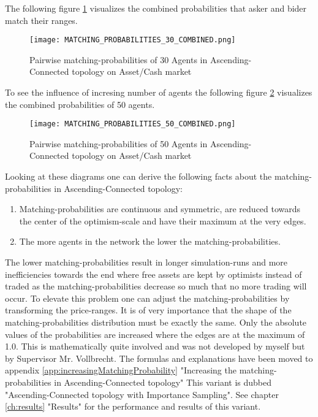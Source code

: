 \documentclass[Bachelorarbeit.tex]{subfiles}
\begin{document}
The following figure \ref{fig:MATCHING_PROBABILITIES_30_COMBINED} visualizes the combined probabilities that asker and bider match their ranges.

\begin{figure}[H]
	\centering
  \texttt{[image: MATCHING\_PROBABILITIES\_30\_COMBINED.png]}
	\caption{Pairwise matching-probabilities of 30 Agents in Ascending-Connected topology on Asset/Cash market}
	\label{fig:MATCHING_PROBABILITIES_30_COMBINED}
\end{figure}

To see the influence of incresing number of agents the following figure \ref{fig:MATCHING_PROBABILITIES_50_COMBINED} visualizes the combined probabilities of 50 agents.

\begin{figure}[H]
	\centering
  \texttt{[image: MATCHING\_PROBABILITIES\_50\_COMBINED.png]}
	\caption{Pairwise matching-probabilities of 50 Agents in Ascending-Connected topology on Asset/Cash market}
	\label{fig:MATCHING_PROBABILITIES_50_COMBINED}
\end{figure}

Looking at these diagrams one can derive the following facts about the matching-probabilities in Ascending-Connected topology:
\begin{enumerate}
\item Matching-probabilities are continuous and symmetric, are reduced towards the center of the optimism-scale and have their maximum at the very edges.
\item The more agents in the network the lower the matching-probabilities.
\end{enumerate}

The lower matching-probabilities result in longer simulation-runs and more inefficiencies towards the end where free assets are kept by optimists instead of traded as the matching-probabilities decrease so much that no more trading will occur. To elevate this problem one can adjust the matching-probabilities by transforming the price-ranges. It is of very importance that the shape of the matching-probabilities distribution must be exactly the same. Only the absolute values of the probabilities are increased where the edges are at the maximum of 1.0. This is mathematically quite involved and was not developed by myself but by Supervisor Mr. Vollbrecht. The formulas and explanations have been moved to appendix \ref{app:increasingMatchingProbability} "Increasing the matching-probabilities in Ascending-Connected topology"
\medskip
This variant is dubbed "Ascending-Connected topology with Importance Sampling". See chapter \ref{ch:results} "Results" for the performance and results of this variant.
\end{document}
